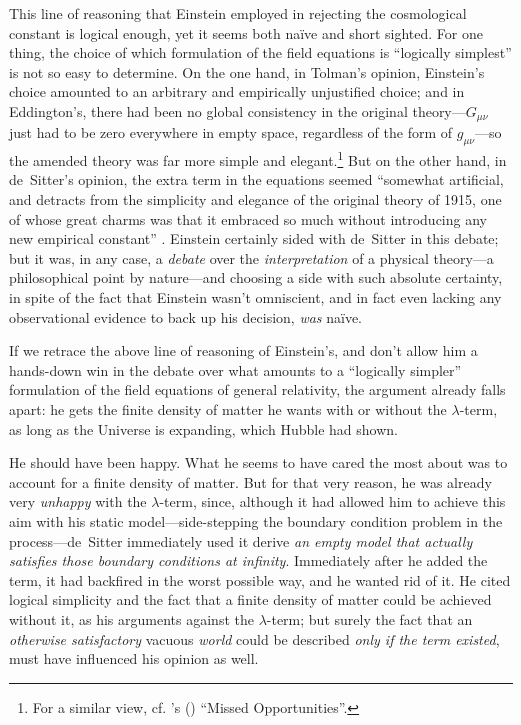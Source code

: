\documentclass[12 pt]{article}
\def\citeapos#1{\citeauthor{#1}'s (\citeyear{#1})}
\begin{document}
This line of reasoning that Einstein employed in rejecting the cosmological constant is logical enough, yet it seems both na\"{i}ve and short sighted. For one thing, the choice of which formulation of the field equations is ``logically simplest'' is not so easy to determine. On the one hand, in Tolman's opinion, Einstein's choice amounted to an arbitrary and empirically unjustified choice; and in Eddington's, there had been no global consistency in the original theory---$G_{\mu\nu}$ just had to be zero everywhere in empty space, regardless of the form of $g_{\mu\nu}$---so the amended theory was far more simple and elegant.\footnote{For a similar view, cf. \citeapos{Dyson1972} ``Missed Opportunities''.} But on the other hand, in de~Sitter's opinion, the extra term in the equations seemed ``somewhat artificial, and detracts from the simplicity and elegance of the original theory of 1915, one of whose great charms was that it embraced so much without introducing any new empirical constant'' \citep{deSitter1917b}. Einstein certainly sided with de~Sitter in this debate; but it was, in any case, a \textit{debate} over the \textit{interpretation} of a physical theory---a philosophical point by nature---and choosing a side with such absolute certainty, in spite of the fact that Einstein wasn't omniscient, and in fact even lacking any observational evidence to back up his decision, \textit{was} na\"{i}ve. 

If we retrace the above line of reasoning of Einstein's, and don't allow him a hands-down win in the debate over what amounts to a ``logically simpler'' formulation of the field equations of general relativity, the argument already falls apart: he gets the finite density of matter he wants with or without the $\lambda$-term, as long as the Universe is expanding, which Hubble had shown.

He should have been happy. What he seems to have cared the most about was to account for a finite density of matter. But for that very reason, he was already very \textit{unhappy} with the $\lambda$-term, since, although it had allowed him to achieve this aim with his static model---side-stepping the boundary condition problem in the process---de~Sitter immediately used it derive \textit{an empty model that actually satisfies those boundary conditions at infinity}. Immediately after he added the term, it had backfired in the worst possible way, and he wanted rid of it. He cited logical simplicity and the fact that a finite density of matter could be achieved without it, as his arguments against the $\lambda$-term; but surely the fact that an \textit{otherwise satisfactory} vacuous \textit{world} could be described \textit{only if the term existed}, must have influenced his opinion as well. 
\end{document}
